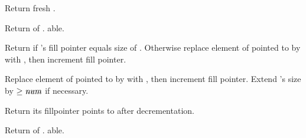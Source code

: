 \begin{LIST}{1cm}
  
  {
  Return fresh .
  }

  {
  Return  of . able.
  }

  {
  Return \retval{\NIL} if 's fill pointer equals size of
  . Otherwise replace element of  pointed to
  by  with , then increment fill
  pointer. 
  }

  {
  Replace element of  pointed to by  with
  , then increment fill pointer. Extend 's size by
  $\ge \VAR{num}$ if necessary.
  }

  {
  Return  its fillpointer points to
  after decrementation.
  }

  {
  Return  of . able.
  }

\end{LIST}


